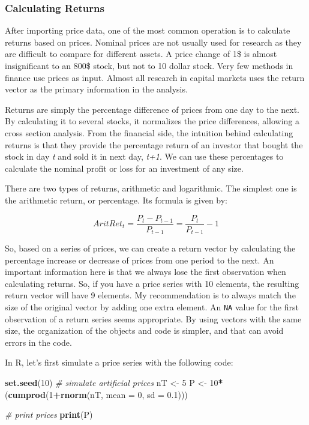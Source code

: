 \documentclass[11pt,]{book}
\newenvironment{Shaded}{\begin{snugshade}}{\end{snugshade}}
\newcommand{\KeywordTok}[1]{\textcolor[rgb]{0.27,0.27,0.27}{\textbf{#1}}}
\newcommand{\DataTypeTok}[1]{\textcolor[rgb]{0.27,0.27,0.27}{#1}}
\newcommand{\DecValTok}[1]{\textcolor[rgb]{0.06,0.06,0.06}{#1}}
\newcommand{\FloatTok}[1]{\textcolor[rgb]{0.06,0.06,0.06}{#1}}
\newcommand{\StringTok}[1]{\textcolor[rgb]{0.5,0.5,0.5}{#1}}
\newcommand{\CommentTok}[1]{\textcolor[rgb]{0.56,0.35,0.01}{\textit{#1}}}
\newcommand{\OperatorTok}[1]{\textcolor[rgb]{0.81,0.36,0.00}{\textbf{#1}}}
\newcommand{\NormalTok}[1]{#1}
\begin{document}
\subsubsection{Calculating Returns}\label{calculating-returns}

After importing price data, one of the most common operation is to
calculate returns based on prices. Nominal prices are not usually used
for research as they are difficult to compare for different assets. A
price change of 1\$ is almost insignificant to an 800\$ stock, but not
to 10 dollar stock. Very few methods in finance use prices as input.
Almost all research in capital markets uses the return vector as the
primary information in the analysis.

Returns are simply the percentage difference of prices from one day to
the next. By calculating it to several stocks, it normalizes the price
differences, allowing a cross section analysis. From the financial side,
the intuition behind calculating returns is that they provide the
percentage return of an investor that bought the stock in day \emph{t}
and sold it in next day, \emph{t+1}. We can use these percentages to
calculate the nominal profit or loss for an investment of any size.

There are two types of returns, arithmetic and logarithmic. The simplest
one is the arithmetic return, or percentage. Its formula is given by:

\[AritRet_t = \frac{P_t-P_{t-1}}{P_{t-1}} =\frac{P_t}{P_{t-1}}-1 \]

So, based on a series of prices, we can create a return vector by
calculating the percentage increase or decrease of prices from one
period to the next. An important information here is that we always lose
the first observation when calculating returns. So, if you have a price
series with 10 elements, the resulting return vector will have 9
elements. My recommendation is to always match the size of the original
vector by adding one extra element. An \texttt{NA} value for the first
observation of a return series seems appropriate. By using vectors with
the same size, the organization of the objects and code is simpler, and
that can avoid errors in the code.

In R, let's first simulate a price series with the following code:

\begin{Shaded}
\begin{Highlighting}[]
\KeywordTok{set.seed}\NormalTok{(}\DecValTok{10}\NormalTok{)}
\CommentTok{# simulate artificial prices}
\NormalTok{nT <-}\StringTok{ }\DecValTok{5}
\NormalTok{P <-}\StringTok{ }\DecValTok{10}\OperatorTok{*}\NormalTok{(}\KeywordTok{cumprod}\NormalTok{(}\DecValTok{1}\OperatorTok{+}\KeywordTok{rnorm}\NormalTok{(nT, }
                         \DataTypeTok{mean =} \DecValTok{0}\NormalTok{, }
                         \DataTypeTok{sd =} \FloatTok{0.1}\NormalTok{)))}

\CommentTok{# print prices}
\KeywordTok{print}\NormalTok{(P)}
\end{Highlighting}
\end{Shaded}
\end{document}
